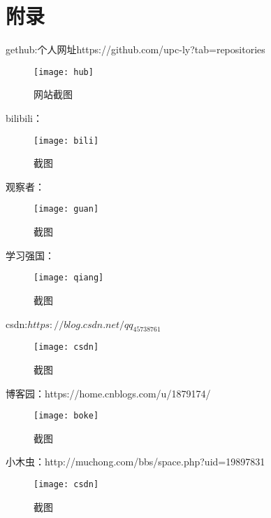 \documentclass{article}
\begin{document}
\section{附录}
	gethub:个人网址https://github.com/upc-ly?tab=repositories\par 
	\begin{figure}[h]
		\centering
		\texttt{[image: hub]}
		\caption{网站截图}
	\end{figure}
bilibili：
\begin{figure}[h]
	\centering
	\texttt{[image: bili]}
	\caption{截图}
\end{figure}
\newpage
观察者：
\begin{figure}[h]
	\centering
	\texttt{[image: guan]}
	\caption{截图}
\end{figure}
\newpage
学习强国：
\begin{figure}[h]
	\centering
	\texttt{[image: qiang]}
	\caption{截图}
\end{figure}
\newpage
csdn:$https://blog.csdn.net/qq_45738761 $
\begin{figure}[h]
	\centering
	\texttt{[image: csdn]}
	\caption{截图}
\end{figure}
\newpage
博客园：https://home.cnblogs.com/u/1879174/ \par 
\begin{figure}[h]
	\centering
	\texttt{[image: boke]}
	\caption{截图}
\end{figure}
\newpage
	小木虫：http://muchong.com/bbs/space.php?uid=19897831  \par 
\begin{figure}[h]
		\centering
		\texttt{[image: csdn]}
		\caption{截图}
\end{figure}


\hspace*{\fill} \\


\end{document}
